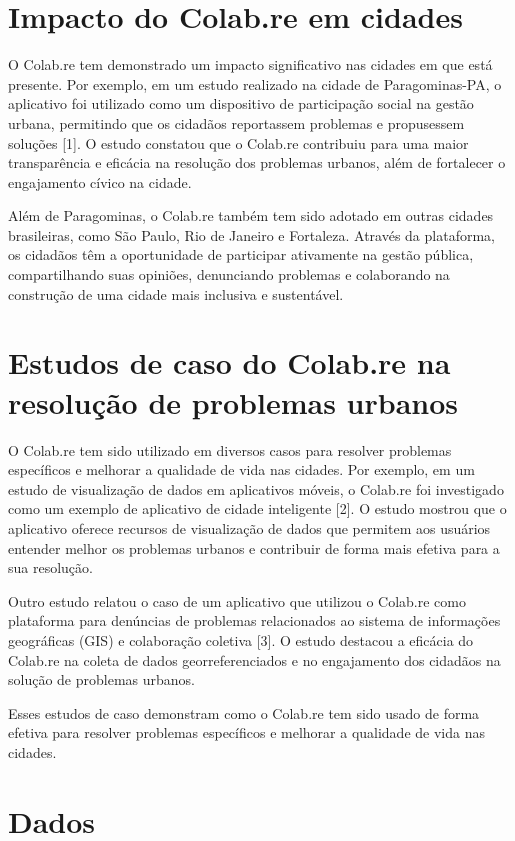 \section*{Impacto do Colab.re em cidades}
O Colab.re tem demonstrado um impacto significativo nas cidades em que está presente. Por exemplo, em um estudo realizado na cidade de Paragominas-PA, o aplicativo foi utilizado como um dispositivo de participação social na gestão urbana, permitindo que os cidadãos reportassem problemas e propusessem soluções [1]. O estudo constatou que o Colab.re contribuiu para uma maior transparência e eficácia na resolução dos problemas urbanos, além de fortalecer o engajamento cívico na cidade.

Além de Paragominas, o Colab.re também tem sido adotado em outras cidades brasileiras, como São Paulo, Rio de Janeiro e Fortaleza. Através da plataforma, os cidadãos têm a oportunidade de participar ativamente na gestão pública, compartilhando suas opiniões, denunciando problemas e colaborando na construção de uma cidade mais inclusiva e sustentável.

\section*{Estudos de caso do Colab.re na resolução de problemas urbanos}
O Colab.re tem sido utilizado em diversos casos para resolver problemas específicos e melhorar a qualidade de vida nas cidades. Por exemplo, em um estudo de visualização de dados em aplicativos móveis, o Colab.re foi investigado como um exemplo de aplicativo de cidade inteligente [2]. O estudo mostrou que o aplicativo oferece recursos de visualização de dados que permitem aos usuários entender melhor os problemas urbanos e contribuir de forma mais efetiva para a sua resolução.

Outro estudo relatou o caso de um aplicativo que utilizou o Colab.re como plataforma para denúncias de problemas relacionados ao sistema de informações geográficas (GIS) e colaboração coletiva [3]. O estudo destacou a eficácia do Colab.re na coleta de dados georreferenciados e no engajamento dos cidadãos na solução de problemas urbanos.

Esses estudos de caso demonstram como o Colab.re tem sido usado de forma efetiva para resolver problemas específicos e melhorar a qualidade de vida nas cidades.

\section{Dados}

